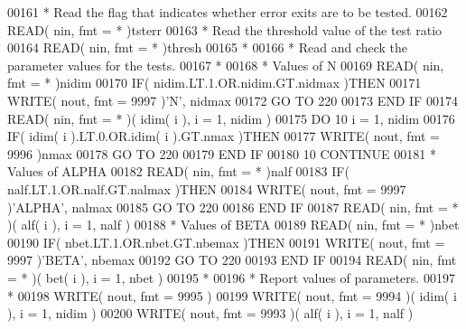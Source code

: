 \begin{DoxyCode}
00161 \textcolor{comment}{*     Read the flag that indicates whether error exits are to be tested.}
00162       \textcolor{keyword}{READ}( nin, fmt = * )tsterr
00163 \textcolor{comment}{*     Read the threshold value of the test ratio}
00164       \textcolor{keyword}{READ}( nin, fmt = * )thresh
00165 \textcolor{comment}{*}
00166 \textcolor{comment}{*     Read and check the parameter values for the tests.}
00167 \textcolor{comment}{*}
00168 \textcolor{comment}{*     Values of N}
00169       \textcolor{keyword}{READ}( nin, fmt = * )nidim
00170       \textcolor{keywordflow}{IF}( nidim.LT.1.OR.nidim.GT.nidmax )\textcolor{keywordflow}{THEN}
00171          \textcolor{keyword}{WRITE}( nout, fmt = 9997 )\textcolor{stringliteral}{'N'}, nidmax
00172          \textcolor{keywordflow}{GO TO} 220
00173 \textcolor{keywordflow}{      END IF}
00174       \textcolor{keyword}{READ}( nin, fmt = * )( idim( i ), i = 1, nidim )
00175       \textcolor{keywordflow}{DO} 10 i = 1, nidim
00176          \textcolor{keywordflow}{IF}( idim( i ).LT.0.OR.idim( i ).GT.nmax )\textcolor{keywordflow}{THEN}
00177             \textcolor{keyword}{WRITE}( nout, fmt = 9996 )nmax
00178             \textcolor{keywordflow}{GO TO} 220
00179 \textcolor{keywordflow}{         END IF}
00180    10 \textcolor{keywordflow}{CONTINUE}
00181 \textcolor{comment}{*     Values of ALPHA}
00182       \textcolor{keyword}{READ}( nin, fmt = * )nalf
00183       \textcolor{keywordflow}{IF}( nalf.LT.1.OR.nalf.GT.nalmax )\textcolor{keywordflow}{THEN}
00184          \textcolor{keyword}{WRITE}( nout, fmt = 9997 )\textcolor{stringliteral}{'ALPHA'}, nalmax
00185          \textcolor{keywordflow}{GO TO} 220
00186 \textcolor{keywordflow}{      END IF}
00187       \textcolor{keyword}{READ}( nin, fmt = * )( alf( i ), i = 1, nalf )
00188 \textcolor{comment}{*     Values of BETA}
00189       \textcolor{keyword}{READ}( nin, fmt = * )nbet
00190       \textcolor{keywordflow}{IF}( nbet.LT.1.OR.nbet.GT.nbemax )\textcolor{keywordflow}{THEN}
00191          \textcolor{keyword}{WRITE}( nout, fmt = 9997 )\textcolor{stringliteral}{'BETA'}, nbemax
00192          \textcolor{keywordflow}{GO TO} 220
00193 \textcolor{keywordflow}{      END IF}
00194       \textcolor{keyword}{READ}( nin, fmt = * )( bet( i ), i = 1, nbet )
00195 \textcolor{comment}{*}
00196 \textcolor{comment}{*     Report values of parameters.}
00197 \textcolor{comment}{*}
00198       \textcolor{keyword}{WRITE}( nout, fmt = 9995 )
00199       \textcolor{keyword}{WRITE}( nout, fmt = 9994 )( idim( i ), i = 1, nidim )
00200       \textcolor{keyword}{WRITE}( nout, fmt = 9993 )( alf( i ), i = 1, nalf )

\end{DoxyCode}
